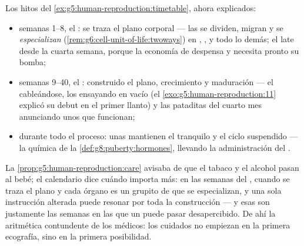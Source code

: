 \begin{proposition}\label{prop:g8:from-egg-to-birth:timetable}
Los hitos del \cref{ex:g5:human-reproduction:timetable}, ahora
explicados:
\begin{itemize}
  \item semanas 1--8, el \emph{}: se traza el plano corporal ---
        las  se dividen, migran y se
        \emph{especializan}
        (\cref{rem:g6:cell-unit-of-life:twoways}) en , ,
         y todo lo demás; el  late desde la cuarta semana,
        porque la economía de despensa y  necesita pronto su
        bomba;
  \item semanas 9--40, el \emph{}: construido el plano, crecimiento
        y maduración --- el  cableándose, los  ensayando
        en vacío (el \cref{exo:g5:human-reproduction:11} explicó su
        debut en el primer llanto) y las pataditas del cuarto mes
        anunciando unos  que funcionan;
  \item durante todo el proceso: unas  mantienen el 
        tranquilo y el ciclo suspendido --- la química de la
        \cref{def:g8:puberty:hormones}, llevando la administración del
        .
\end{itemize}
\end{proposition}
\admitted

\begin{example}\label{ex:g8:from-egg-to-birth:earlycare}
La \cref{prop:g5:human-reproduction:care} avisaba de que el tabaco y el
alcohol pasan al bebé; el calendario dice cuándo importa más: en las
semanas del , cuando se traza el plano y cada órgano es un
grupito de  que se especializan, y una sola instrucción alterada
puede resonar por toda la construcción --- y esas son justamente las
semanas en las que un  puede pasar desapercibido. De ahí la
aritmética contundente de los médicos: los cuidados no empiezan en la
primera ecografía, sino en la primera posibilidad.
\end{example}

